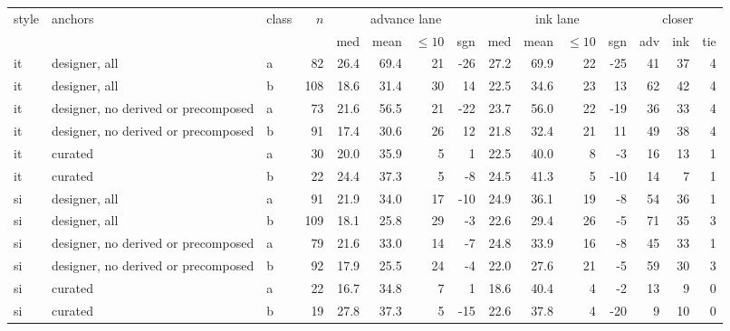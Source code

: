 \begin{tabular}{lllrrrrrrrrrrrr}
style & anchors & class & $n$ & \multicolumn{4}{c}{advance lane} & \multicolumn{4}{c}{ink lane} & \multicolumn{3}{c}{closer} \\
 & & & & med & mean & ${\le}10$ & sgn & med & mean & ${\le}10$ & sgn & adv & ink & tie \\
\hline
it & designer, all & a & 82 & 26.4 & 69.4 & 21 & -26 & 27.2 & 69.9 & 22 & -25 & 41 & 37 & 4 \\
it & designer, all & b & 108 & 18.6 & 31.4 & 30 & 14 & 22.5 & 34.6 & 23 & 13 & 62 & 42 & 4 \\
it & designer, no derived or precomposed & a & 73 & 21.6 & 56.5 & 21 & -22 & 23.7 & 56.0 & 22 & -19 & 36 & 33 & 4 \\
it & designer, no derived or precomposed & b & 91 & 17.4 & 30.6 & 26 & 12 & 21.8 & 32.4 & 21 & 11 & 49 & 38 & 4 \\
it & curated & a & 30 & 20.0 & 35.9 & 5 & 1 & 22.5 & 40.0 & 8 & -3 & 16 & 13 & 1 \\
it & curated & b & 22 & 24.4 & 37.3 & 5 & -8 & 24.5 & 41.3 & 5 & -10 & 14 & 7 & 1 \\
\hline
si & designer, all & a & 91 & 21.9 & 34.0 & 17 & -10 & 24.9 & 36.1 & 19 & -8 & 54 & 36 & 1 \\
si & designer, all & b & 109 & 18.1 & 25.8 & 29 & -3 & 22.6 & 29.4 & 26 & -5 & 71 & 35 & 3 \\
si & designer, no derived or precomposed & a & 79 & 21.6 & 33.0 & 14 & -7 & 24.8 & 33.9 & 16 & -8 & 45 & 33 & 1 \\
si & designer, no derived or precomposed & b & 92 & 17.9 & 25.5 & 24 & -4 & 22.0 & 27.6 & 21 & -5 & 59 & 30 & 3 \\
si & curated & a & 22 & 16.7 & 34.8 & 7 & 1 & 18.6 & 40.4 & 4 & -2 & 13 & 9 & 0 \\
si & curated & b & 19 & 27.8 & 37.3 & 5 & -15 & 22.6 & 37.8 & 4 & -20 & 9 & 10 & 0 \\
\hline
\end{tabular}
